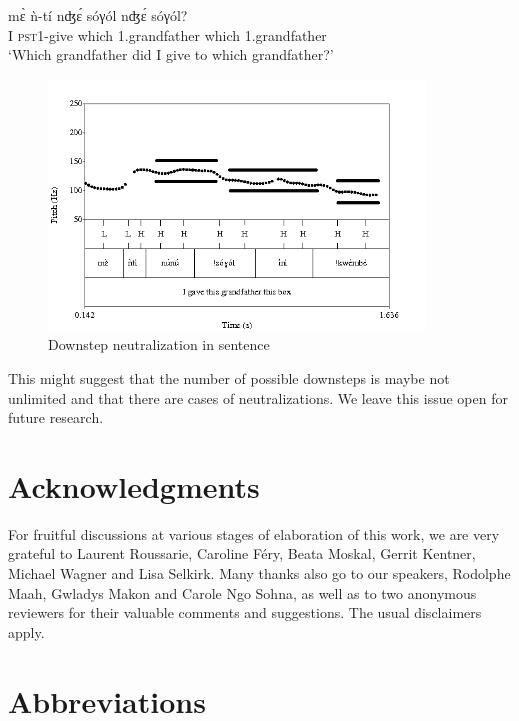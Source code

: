 \documentclass[output=paper,newtxmath,modfonts,nonflat,hidelinks]{langsci/langscibook}
\begin{document}
\ea \gll m\`ɛ ǹ-tí nʤ\'ɛ {\textdownstep}sóγól nʤ\'ɛ {\textdownstep}sóγól?\\
I \textsc{pst1}-give which 1.grandfather which 1.grandfather\\
\glt `Which grandfather did I give to which grandfather?'\label{ex:HamlaouiMakasso:28} 
\z

\begin{figure}

\caption{Downstep neutralization in sentence }
\label{fig:HamlaouiMakasso:9b}
\includegraphics[width=10cm]{figures/NeutralizationSept16B}

\end{figure}

\noindent This might suggest that the number of possible downsteps is maybe not unlimited and that there are cases of neutralizations. We leave this issue open for future research.


\section*{Acknowledgments}

For fruitful discussions at various stages of elaboration of this work, we are very grateful to Laurent Roussarie, Caroline Féry, Beata Moskal, Gerrit Kentner, Michael Wagner and Lisa Selkirk. Many thanks also go to our speakers, Rodolphe Maah, Gwladys Makon and Carole Ngo Sohna, as well as to two anonymous reviewers for their valuable comments and suggestions. The usual disclaimers apply.

\section*{Abbreviations}
\end{document}
